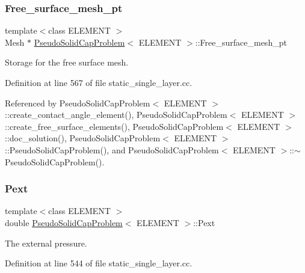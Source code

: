\subsubsection{\texorpdfstring{Free\+\_\+surface\+\_\+mesh\+\_\+pt}{Free\_surface\_mesh\_pt}}
{\footnotesize\ttfamily template$<$class E\+L\+E\+M\+E\+NT $>$ \\
Mesh $\ast$ \hyperlink{classPseudoSolidCapProblem}{Pseudo\+Solid\+Cap\+Problem}$<$ E\+L\+E\+M\+E\+NT $>$\+::Free\+\_\+surface\+\_\+mesh\+\_\+pt\hspace{0.3cm}{\ttfamily [private]}}



Storage for the free surface mesh. 



Definition at line 567 of file static\+\_\+single\+\_\+layer.\+cc.



Referenced by Pseudo\+Solid\+Cap\+Problem$<$ E\+L\+E\+M\+E\+N\+T $>$\+::create\+\_\+contact\+\_\+angle\+\_\+element(), Pseudo\+Solid\+Cap\+Problem$<$ E\+L\+E\+M\+E\+N\+T $>$\+::create\+\_\+free\+\_\+surface\+\_\+elements(), Pseudo\+Solid\+Cap\+Problem$<$ E\+L\+E\+M\+E\+N\+T $>$\+::doc\+\_\+solution(), Pseudo\+Solid\+Cap\+Problem$<$ E\+L\+E\+M\+E\+N\+T $>$\+::\+Pseudo\+Solid\+Cap\+Problem(), and Pseudo\+Solid\+Cap\+Problem$<$ E\+L\+E\+M\+E\+N\+T $>$\+::$\sim$\+Pseudo\+Solid\+Cap\+Problem().

\mbox{\label{classPseudoSolidCapProblem_afbcfe3a5a05d191c44815681e4b621d0}} 
\subsubsection{\texorpdfstring{Pext}{Pext}}
{\footnotesize\ttfamily template$<$class E\+L\+E\+M\+E\+NT $>$ \\
double \hyperlink{classPseudoSolidCapProblem}{Pseudo\+Solid\+Cap\+Problem}$<$ E\+L\+E\+M\+E\+NT $>$\+::Pext\hspace{0.3cm}{\ttfamily [private]}}



The external pressure. 



Definition at line 544 of file static\+\_\+single\+\_\+layer.\+cc.



